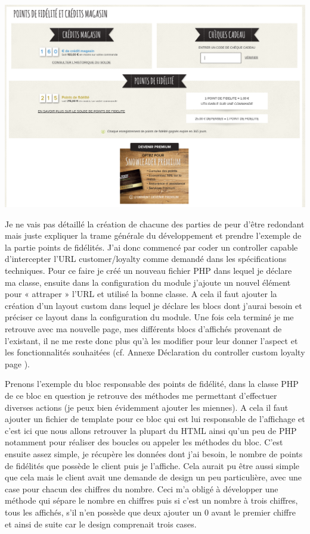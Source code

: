 \documentclass[a4paper,11pt,twoside]{report}
\begin{document}
	\begin{center}
	  \includegraphics[width=\textwidth]{images/SL_loyalty_page1.png} 
	  \label{SL_loyalty_page1}
	\end{center}
	
    	Je ne vais pas détaillé la création de chacune des parties de peur d'être redondant mais juste expliquer la trame générale du développement et prendre l'exemple de la partie points de fidélités. J'ai donc commencé par coder un controller capable d'intercepter l'URL customer/loyalty comme demandé dans les spécifications techniques. Pour ce faire je créé un nouveau fichier PHP dans lequel je déclare ma classe, ensuite dans la configuration du module j'ajoute un nouvel élément pour  « attraper » l'URL et utilisé la bonne classe. A cela il faut ajouter la création d'un layout custom dans lequel je déclare les blocs dont j'aurai besoin et préciser ce layout dans la configuration du module. Une fois cela terminé je me retrouve avec ma nouvelle page, mes différents blocs d'affichés provenant de l'existant, il ne me reste donc plus qu'à les modifier pour leur donner l'aspect et les fonctionnalités souhaitées (cf. Annexe Déclaration du controller custom loyalty page \pageref{SL_loyalty_controller}).
    
    	Prenons l'exemple du bloc responsable des points de fidélité, dans la classe PHP de ce bloc en question je retrouve des méthodes me permettant d'effectuer diverses actions (je peux bien évidemment ajouter les miennes). A cela il faut ajouter un fichier de template pour ce bloc qui est lui responsable de l'affichage et c'est ici que nous allons retrouver la plupart du HTML ainsi qu'un peu de PHP notamment pour réaliser des boucles ou appeler les méthodes du bloc. C'est ensuite assez simple, je récupère les données dont j'ai besoin, le nombre de points de fidélités que possède le client puis je l'affiche. Cela aurait pu être aussi simple que cela mais le client avait une demande de design un peu particulière, avec une case pour chacun des chiffres du nombre. Ceci m'a obligé à développer une méthode qui sépare le nombre en chiffres puis si c'est un nombre à trois chiffres, tous les affichés, s'il n'en possède que deux ajouter un 0 avant le premier chiffre et ainsi de suite car le design comprenait trois cases.
    
\end{document}
